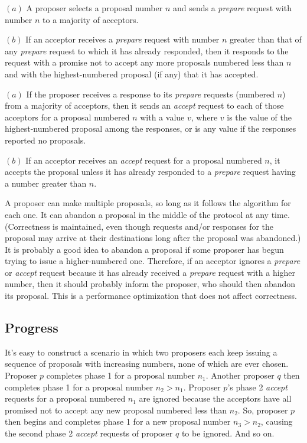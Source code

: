 \begin{phase}
    $(a)$ A proposer selects a proposal number $n$ and sends a \emph{prepare} request with number $n$ to a majority of acceptors.
    
    $(b)$ If an acceptor receives a \emph{prepare} request with number $n$ greater than that of any \emph{prepare} request to which it has already responded, then it responds to the request with a promise not to accept any more proposals numbered less than $n$ and with the highest-numbered proposal (if any) that it has accepted.
\end{phase}

\begin{phase}
    $(a)$ If the proposer receives a response to its \emph{prepare} requests (numbered $n$) from a majority of acceptors, then it sends an \emph{accept} request to each of those acceptors for a proposal numbered $n$ with a value $v$, where $v$ is the value of the highest-numbered proposal among the responses, or is any value if the responses reported no proposals.

    $(b)$ If an acceptor receives an \emph{accept} request for a proposal numbered $n$, it accepts the proposal unless it has already responded to a \emph{prepare} request having a number greater than $n$.
\end{phase}

A proposer can make multiple proposals, so long as it follows the algorithm for each one.
It can abandon a proposal in the middle of the protocol at any time.
(Correctness is maintained, even though requests and/or responses for the proposal may arrive at their destinations long after the proposal was abandoned.)
It is probably a good idea to abandon a proposal if some proposer has begun trying to issue a higher-numbered one.
Therefore, if an acceptor ignores a \emph{prepare} or \emph{accept} request because it has already received a \emph{prepare} request with a higher number, then it should probably inform the proposer, who should then abandon its proposal.
This is a performance optimization that does not affect correctness.

\subsection{Progress}
It's easy to construct a scenario in which two proposers each keep issuing a sequence of proposals with increasing numbers, none of which are ever chosen.
Proposer $p$ completes phase 1 for a proposal number $n_1$.
Another proposer $q$ then completes phase 1 for a proposal number $n_2 > n_1$.
Proposer $p$'s phase 2 \emph{accept} requests for a proposal numbered $n_1$ are ignored because the acceptors have all promised not to accept any new proposal numbered less than $n_2$.
So, proposer $p$ then begins and completes phase 1 for a new proposal number $n_3 > n_2$, causing the second phase 2 \emph{accept} requests of proposer $q$ to be ignored.
And so on.

